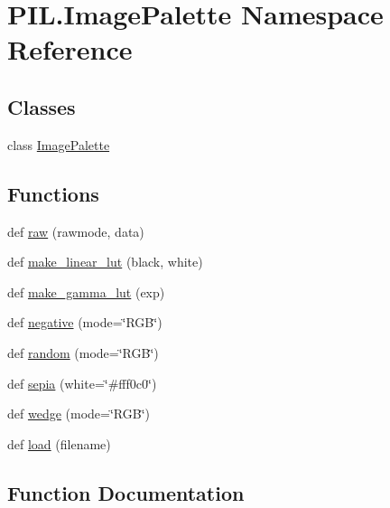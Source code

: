 \hypertarget{namespacePIL_1_1ImagePalette}{}\section{P\+I\+L.\+Image\+Palette Namespace Reference}
\label{namespacePIL_1_1ImagePalette}
\subsection*{Classes}
\begin{DoxyCompactItemize}
\item 
class \hyperlink{classPIL_1_1ImagePalette_1_1ImagePalette}{Image\+Palette}
\end{DoxyCompactItemize}
\subsection*{Functions}
\begin{DoxyCompactItemize}
\item 
def \hyperlink{namespacePIL_1_1ImagePalette_abad1214bbd2cec3c8f0433602766b454}{raw} (rawmode, data)
\item 
def \hyperlink{namespacePIL_1_1ImagePalette_adf464652c29144f692dcd7e818749ccf}{make\+\_\+linear\+\_\+lut} (black, white)
\item 
def \hyperlink{namespacePIL_1_1ImagePalette_ac2d92719bc3c74ea98189d557ff2611e}{make\+\_\+gamma\+\_\+lut} (exp)
\item 
def \hyperlink{namespacePIL_1_1ImagePalette_a8ebc5a0586c4c05f54d1854b2b59ba63}{negative} (mode=\char`\"{}R\+GB\char`\"{})
\item 
def \hyperlink{namespacePIL_1_1ImagePalette_aa64e396511bf2e766d66f2faf7350414}{random} (mode=\char`\"{}R\+GB\char`\"{})
\item 
def \hyperlink{namespacePIL_1_1ImagePalette_a39c3d6f16b6291e8e163b7cabcaad97b}{sepia} (white=\char`\"{}\#fff0c0\char`\"{})
\item 
def \hyperlink{namespacePIL_1_1ImagePalette_ae46654ae7a7e901568c6e4e9563a3213}{wedge} (mode=\char`\"{}R\+GB\char`\"{})
\item 
def \hyperlink{namespacePIL_1_1ImagePalette_ad09f77d38b78d37a07474a0c1fee3993}{load} (filename)
\end{DoxyCompactItemize}


\subsection{Function Documentation}
\mbox{\label{namespacePIL_1_1ImagePalette_ad09f77d38b78d37a07474a0c1fee3993}} 
